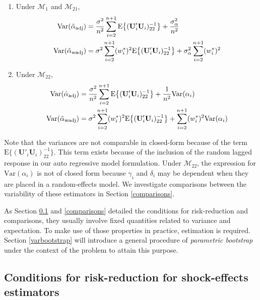 \documentclass[11pt]{article}
\def\mbf#1{\mathbf{#1}} %
\def\mrm#1{\mathrm{#1}} %
\def\mc#1{\mathcal{#1}} %
\def\var#1{\mathrm{Var}(#1)} %
\theoremstyle{definition}
\begin{document}
\begin{enumerate}[label = (\roman*)]
  \item Under $\mc{M}_1$ and $\mc{M}_{21}$,  
\begin{align*}
  \var{\hat{\alpha}_{\rm adj}} 
  &=\frac{\sigma^2}{n^2}\sum_{i=2}^{n+1}\mrm{E}\big\{(\mbf{U}'_i\mbf{U}_i)^{-1}_{22}\big\}+\frac{\sigma^2_{\alpha}}{n^2}\\
\var{\hat{\alpha}_{\rm wadj}}  &= \sigma^2\sum_{i=2}^{n+1}(w_i^*)^2\mrm{E}\big\{(\mbf{U}'_i\mbf{U}_i)^{-1}_{22}\big\}+\sigma^2_{\alpha}\sum_{i=2}^{n+1}(w_i^*)^2
\end{align*}
\item Under $\mc{M}_{22}$, 
\begin{align*}
\var{\hat{\alpha}_{\rm adj}} 
  &=\frac{\sigma^2}{n^2}\sum_{i=2}^{n+1}\mrm{E}\big\{(\mbf{U}'_i\mbf{U}_i)^{-1}_{22}\big\}+\frac{1}{n^2}\var{\alpha_i}\\
  \var{\hat{\alpha}_{\rm wadj}} 
  &= \sigma^2\sum_{i=2}^{n+1}(w_i^*)^2\mrm{E}\big\{(\mbf{U}'_i\mbf{U}_i)^{-1}_{22}\big\}
  + \sum_{i=2}^{n+1} (w_i^*)^2 \var{\alpha_i}
\end{align*}
\end{enumerate}
Note that the variances are not comparable in closed-form %
because of the term $\mrm{E}\big\{(\mbf{U}'_i\mbf{U}_i)^{-1}_{22}\big\}$.  This term exists because of the inclusion of the random lagged response in our auto regressive model formulation.  Under $\mc{M}_{22}$, the expression for $\var{\alpha_i}$ is not of closed form because $\gamma_i$ and $\delta_i$ may be dependent when they are placed in a random-effects model. We investigate comparisons between the variability of these estimators in Section \ref{comparisons}.%



As Section \ref{conditions} and \ref{comparisons} detailed the conditions for risk-reduction and comparisons, they usually involve fixed quantities related to variance and expectation. To make use of those properties in practice, estimation is required. Section \ref{varbootstrap} will introduce a general procedure of \emph{parametric bootstrap} under the context of the problem to attain this purpose.


\subsection{Conditions for risk-reduction for shock-effects estimators}
\label{conditions}
\end{document}
